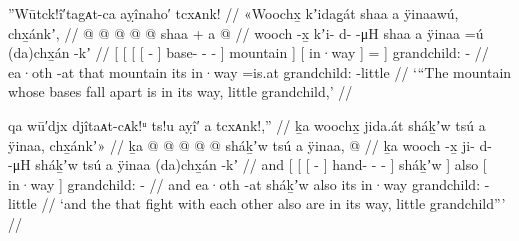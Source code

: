 \ex\label{ex:92-91-mountain-in-way}%
%
\begingl
	\glpreamble	”Wūtck!î′tagᴀt-ca aỵînaho′ tcxᴀnk! //
	\glpreamble	«\!Woochx̱ kʼidag̱át shaa a ÿinaawú, chx̱ánkʼ, //
	\gla	{} {} {} {}  @ {} {}
			 @ {} @ {} @ {} @ {} {}
			shaa {} +
		{} a  {} {} {}
		 @ {} //
	\glb	{} {} {} {} wooch -x̱ {}
			kʼi- d-  -μH {} {}
			shaa {}
		{} a ÿinaa {} =ú {}
		(da)chx̱án -kʼ //
	\glc	{}[ {}[ {}[ {}[  - {}]
			base- -  - \· {}]
			mountain {}]
		{}[  in·way {}] = {}]
		grandchild: - //
	\gld	{} {} {} {} ea·oth -at {}
			 {} {} {} \·that {}
			mountain {}
		{} its in·way {} =is.at {}
		grandchild: -little //
	\glft	‘“The mountain whose bases fall apart is in its way, little grandchild,’
		//
\endgl
\xe


\ex\label{ex:92-92-also-shakhw-in-way}%
%
\begingl
	\glpreamble	qa wū′djx djîtaᴀt-cᴀk!ᵘ ts!u aỵî′ a tcxᴀnk!,” //
	\glpreamble	ḵa woochx̱ jida.át sháḵʼw tsú a ÿinaa, chx̱ánkʼ\!» //
	\gla	ḵa {} {} {}  @ {} {}  @ {} @ {} @ {} @ {} {}
			sháḵʼw {} tsú
		{} a ÿinaa, {}
		 @ {} //
	\glb	ḵa {} {} {} wooch -x̱ {}
			ji- d-  -μH {} {}
			sháḵʼw {} tsú
		{} a ÿinaa {}
		(da)chx̱án -kʼ //
	\glc	and {}[ {}[ {}[  - {}]
			hand- -  - \· {}]
			sháḵʼw {}] also
		{}[  in·way {}]
		grandchild: - //
	\gld	and {} {} {} ea·oth -at {}  {} {} {} {} {}
			sháḵʼw {} also
		{} its in·way {}
		grandchild: -little //
	\glft	‘and the  that fight with each other also are in its way, little grandchild”’
		//
\endgl
\xe

